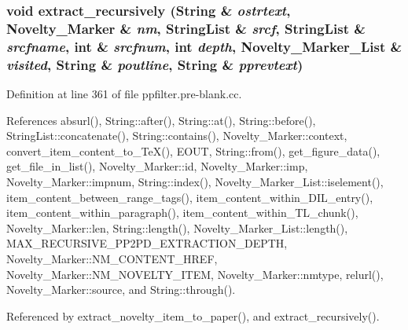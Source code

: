 \subsubsection{\setlength{\rightskip}{0pt plus 5cm}void extract\_\-recursively ({\bf String} \& {\em ostrtext}, {\bf Novelty\_\-Marker} \& {\em nm}, {\bf String\-List} \& {\em srcf}, {\bf String\-List} \& {\em srcfname}, int \& {\em srcfnum}, int {\em depth}, {\bf Novelty\_\-Marker\_\-List} \& {\em visited}, {\bf String} \& {\em poutline}, {\bf String} \& {\em pprevtext})}\label{ppfilter_8pre-blank_8cc_a12}




Definition at line 361 of file ppfilter.pre-blank.cc.

References absurl(), String::after(), String::at(), String::before(), String\-List::concatenate(), String::contains(), Novelty\_\-Marker::context, convert\_\-item\_\-content\_\-to\_\-Te\-X(), EOUT, String::from(), get\_\-figure\_\-data(), get\_\-file\_\-in\_\-list(), Novelty\_\-Marker::id, Novelty\_\-Marker::imp, Novelty\_\-Marker::impnum, String::index(), Novelty\_\-Marker\_\-List::iselement(), item\_\-content\_\-between\_\-range\_\-tags(), item\_\-content\_\-within\_\-DIL\_\-entry(), item\_\-content\_\-within\_\-paragraph(), item\_\-content\_\-within\_\-TL\_\-chunk(), Novelty\_\-Marker::len, String::length(), Novelty\_\-Marker\_\-List::length(), MAX\_\-RECURSIVE\_\-PP2PD\_\-EXTRACTION\_\-DEPTH, Novelty\_\-Marker::NM\_\-CONTENT\_\-HREF, Novelty\_\-Marker::NM\_\-NOVELTY\_\-ITEM, Novelty\_\-Marker::nmtype, relurl(), Novelty\_\-Marker::source, and String::through().

Referenced by extract\_\-novelty\_\-item\_\-to\_\-paper(), and extract\_\-recursively().



